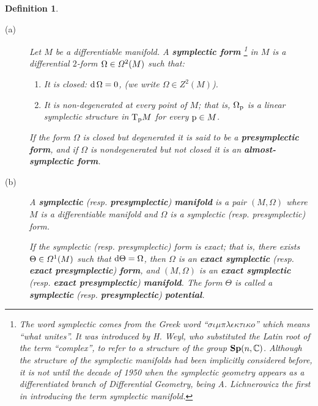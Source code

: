 \documentclass[12pt]{report}
\newtheorem{definition}[teor]{Definition}
\def\d{{\rm d}}
\def\Complex{\mathbb{C}}
\def\Tan{{\rm T}}
\begin{document}
\begin{definition}
\begin{description}
\item[{\rm (a)}]
Let $M$ be a differentiable manifold.
A \textbf{symplectic form}
\footnote{
The word {\sl  symplectic} comes from the Greek word
``$\sigma\iota\mu\pi\lambda\epsilon\kappa\tau\iota\kappa o$''  which means ``what unites''.
It was introduced by H. Weyl, who substituted
the Latin root of the term ``complex'',
to refer to a structure of the group
${\bf Sp}(n,\Complex )$.
Although the structure of the symplectic manifolds
had been implicitly considered before, 
it is not until the decade of 1950 when the symplectic geometry appears
as a differentiated branch of Differential Geometry, being
A. Lichnerowicz the first in introducing the term
{\sl  symplectic manifold}.}
in $M$ is a differential $2$-form
$\Omega \in {\mit\Omega}^2(M)$ such that:
\begin{enumerate}
\item
It is closed: $\d\, \Omega = 0$, (we write $\Omega \in Z^2(M)$).
\item
It is non-degenerated at every point of $M$; that is, $\Omega_{{\rm p}}$ is a linear symplectic structure in $\Tan_{\rm p}M$ for every ${\rm p}\in M$.
\end{enumerate}
If the form $\Omega$ is closed but degenerated it is said to be a
\textbf{presymplectic form}, and if $\Omega$ is nondegenerated but not closed
it is an \textbf{almost-symplectic form}.
\item[{\rm (b)}]
A \textbf{symplectic} (resp. \textbf{presymplectic}) \textbf{manifold}
 is a pair $(M,\Omega )$ where $M$ is a differentiable manifold
and $\Omega$ is a symplectic (resp. presymplectic) form.

If the symplectic (resp. presymplectic)  form is exact;
that is, there exists
$\Theta \in {\mit\Omega}^1(M)$ such that $\d\Theta = \Omega$,
then $\Omega$ is an \textbf{exact symplectic} (resp. \textbf{exact presymplectic}) 
\textbf{form}, and $(M,\Omega )$ is an
\textbf{exact symplectic} (resp. \textbf{exact presymplectic}) \textbf{manifold}.
The form $\Theta$ is called a \textbf{symplectic} (resp. \textbf{presymplectic}) \textbf{potential}.
\end{description}
\label{vsm}
\end{definition}
\end{document}
